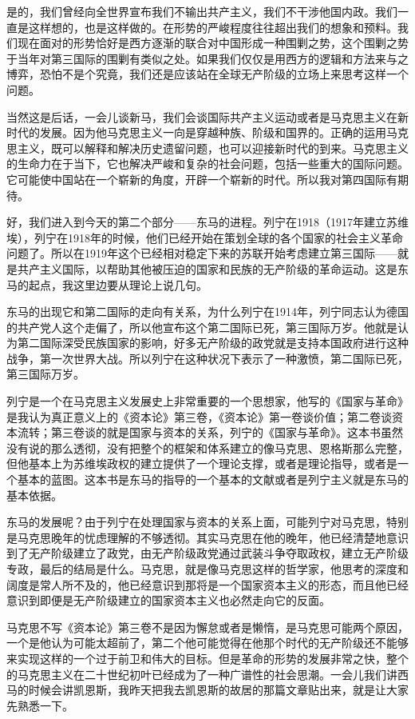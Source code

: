\documentclass[UTF8, 12pt, a4paper]{ctexrep}
\begin{document}
是的，我们曾经向全世界宣布我们不输出共产主义，我们不干涉他国内政。我们一直是这样想的，也是这样做的。在形势的严峻程度往往超出我们的想象和预料。我们现在面对的形势恰好是西方逐渐的联合对中国形成一种围剿之势，这个围剿之势于当年对第三国际的围剿有类似之处。如果我们仅仅是用西方的逻辑和方法来与之博弈，恐怕不是个究竟，我们还是应该站在全球无产阶级的立场上来思考这样一个问题。

当然这是后话，一会儿谈新马，我们会谈国际共产主义运动或者是马克思主义在新时代的发展。因为他马克思主义一向是穿越种族、阶级和国界的。正确的运用马克思主义，既可以解释和解决历史遗留问题，也可以迎接新时代的到来。马克思主义的生命力在于当下，它也解决严峻和复杂的社会问题，包括一些重大的国际问题。它可能使中国站在一个崭新的角度，开辟一个崭新的时代。所以我对第四国际有期待。

好，我们进入到今天的第二个部分——东马的进程。列宁在1918（1917年建立苏维埃），列宁在1918年的时候，他们已经开始在策划全球的各个国家的社会主义革命问题了。所以在1919年这个已经相对稳定下来的苏联开始考虑建立第三国际——就是共产主义国际，以帮助其他被压迫的国家和民族的无产阶级的革命运动。这是东马的起点，我这里边要从理论上说几句。

东马的出现它和第二国际的走向有关系，为什么列宁在1914年，列宁同志认为德国的共产党人这个走偏了，所以他宣布这个第二国际已死，第三国际万岁。他就是认为第二国际深受民族国家的影响，好多无产阶级的政党就是支持本国政府进行这种战争，第一次世界大战。所以列宁在这种状况下表示了一种激愤，第二国际已死，第三国际万岁。

列宁是一个在马克思主义发展史上非常重要的一个思想家，他写的《国家与革命》是我认为真正意义上的《资本论》第三卷，《资本论》第一卷谈价值；第二卷谈资本流转；第三卷谈的就是国家与资本的关系，列宁的《国家与革命》。这本书虽然没有说的那么透彻，没有把整个的框架和体系建立的像马克思、恩格斯那么完整，但他基本上为苏维埃政权的建立提供了一个理论支撑，或者是理论指导，或者是一个基本的蓝图。这本书是东马的指导的一个基本的文献或者是列宁主义就是东马的基本依据。

东马的发展呢？由于列宁在处理国家与资本的关系上面，可能列宁对马克思，特别是马克思晚年的忧虑理解的不够透彻。其实马克思在他的晚年，他已经清楚地意识到了无产阶级建立了政党，由无产阶级政党通过武装斗争夺取政权，建立无产阶级专政，最后的结局是什么。马克思，就是像马克思这样的哲学家，他思考的深度和阔度是常人所不及的，他已经意识到那将是一个国家资本主义的形态，而且他已经意识到即便是无产阶级建立的国家资本主义也必然走向它的反面。

马克思不写《资本论》第三卷不是因为懈怠或者是懒惰，是马克思可能两个原因，一个是他认为可能太超前了，第二个他可能觉得在他那个时代的无产阶级还不能够来实现这样的一个过于前卫和伟大的目标。但是革命的形势的发展非常之快，整个的马克思主义在二十世纪初叶已经成为了一种广谱性的社会思潮。一会儿我们讲西马的时候会讲凯恩斯，我昨天把我去凯恩斯的故居的那篇文章贴出来，就是让大家先熟悉一下。
\end{document}
